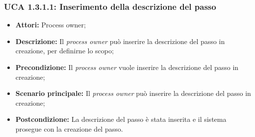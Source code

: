 \hypertarget{A1.3.1.1}{}
\subsubsection{UCA 1.3.1.1: Inserimento della descrizione del passo}
\begin{itemize}
\item \textbf{Attori:} Process owner;
\item \textbf{Descrizione:}
Il \textit{process owner} può inserire la descrizione del passo in creazione, per definirne lo scopo;
\item \textbf{Precondizione:}
Il \textit{process owner} vuole inserire la descrizione del passo in creazione;
\item \textbf{Scenario principale:}
Il \textit{process owner} può inserire la descrizione del passo in creazione;
\item \textbf{Postcondizione:}
La descrizione del passo è stata inserita e il sistema prosegue con la creazione del passo.
\end{itemize}

\hypertarget{A1.3.1.2}{}
